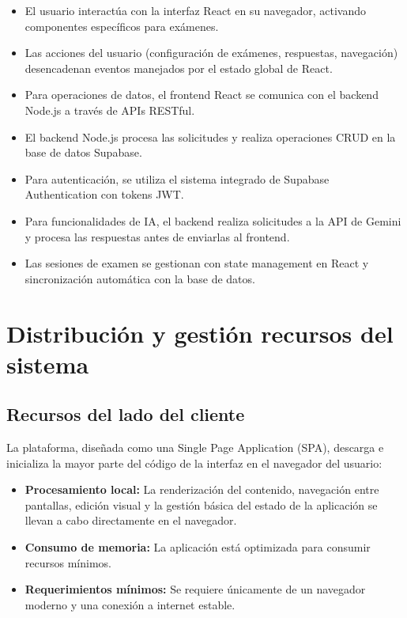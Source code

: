 \documentclass[12pt,a4paper]{report}
\begin{document}
\begin{itemize}
\item El usuario interactúa con la interfaz React en su navegador, activando componentes específicos para exámenes.
\item Las acciones del usuario (configuración de exámenes, respuestas, navegación) desencadenan eventos manejados por el estado global de React.
\item Para operaciones de datos, el frontend React se comunica con el backend Node.js a través de APIs RESTful.
\item El backend Node.js procesa las solicitudes y realiza operaciones CRUD en la base de datos Supabase.
\item Para autenticación, se utiliza el sistema integrado de Supabase Authentication con tokens JWT.
\item Para funcionalidades de IA, el backend realiza solicitudes a la API de Gemini y procesa las respuestas antes de enviarlas al frontend.
\item Las sesiones de examen se gestionan con state management en React y sincronización automática con la base de datos.
\end{itemize}

\section{Distribución y gestión recursos del sistema}

\subsection{Recursos del lado del cliente}

La plataforma, diseñada como una Single Page Application (SPA), descarga e inicializa la mayor parte del código de la interfaz en el navegador del usuario:

\begin{itemize}
\item \textbf{Procesamiento local:} La renderización del contenido, navegación entre pantallas, edición visual y la gestión básica del estado de la aplicación se llevan a cabo directamente en el navegador.

\item \textbf{Consumo de memoria:} La aplicación está optimizada para consumir recursos mínimos.

\item \textbf{Requerimientos mínimos:} Se requiere únicamente de un navegador moderno y una conexión a internet estable.
\end{itemize}
\end{document}
